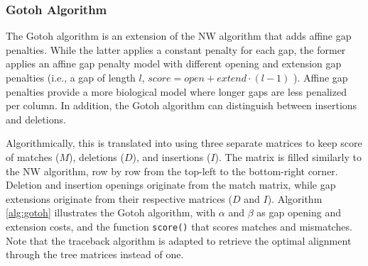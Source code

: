
\subsubsection{Gotoh Algorithm}

The Gotoh algorithm \citep{gotoh_1982} is an extension of the NW algorithm that adds affine gap penalties. While the latter applies a constant penalty for each gap, the former applies an affine gap penalty model with different opening and extension gap penalties (i.e., a gap of length $l$, $score = open + extend \cdot (l - 1)$ ). Affine gap penalties provide a more biological model where longer gaps are less penalized per column. In addition, the Gotoh algorithm can distinguish between insertions and deletions.

Algorithmically, this is translated into using three separate matrices to keep score of matches ($M$), deletions ($D$), and insertions ($I$). The matrix is filled similarly to the NW algorithm, row by row from the top-left to the bottom-right corner. Deletion and insertion openings originate from the match matrix, while gap extensions originate from their respective matrices ($D$ and $I$). Algorithm \ref{alg:gotoh} illustrates the Gotoh algorithm, with $\alpha$ and $\beta$ as gap opening and extension costs, and the function \verb|score()| that scores matches and mismatches. Note that the traceback algorithm is adapted to retrieve the optimal alignment through the tree matrices instead of one.


